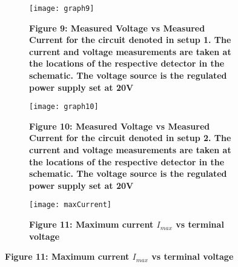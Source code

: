 \begin{figure}[H]
	\begin{subfigure}{0.45\textwidth}
		\texttt{[image: graph9]}
		\caption{\textbf{Figure 9: Measured Voltage vs Measured Current for the circuit denoted in setup 1. The current and voltage measurements are taken at the locations of the respective detector in the schematic. The voltage source is the regulated power supply set at 20V}}
	\end{subfigure}
    \hspace{0.08\textwidth}
	\begin{subfigure}{0.45\textwidth}
		\texttt{[image: graph10]}
		\caption{\textbf{Figure 10: Measured Voltage vs Measured Current for the circuit denoted in setup 2. The current and voltage measurements are taken at the locations of the respective detector in the schematic. The voltage source is the regulated power supply set at 20V}}
	\end{subfigure}
    \begin{subfigure}{0.45\textwidth}
		\texttt{[image: maxCurrent]}
		\caption{\textbf{Figure 11: Maximum current $I_{max}$ vs terminal voltage}}
	\end{subfigure}
\end{figure}

